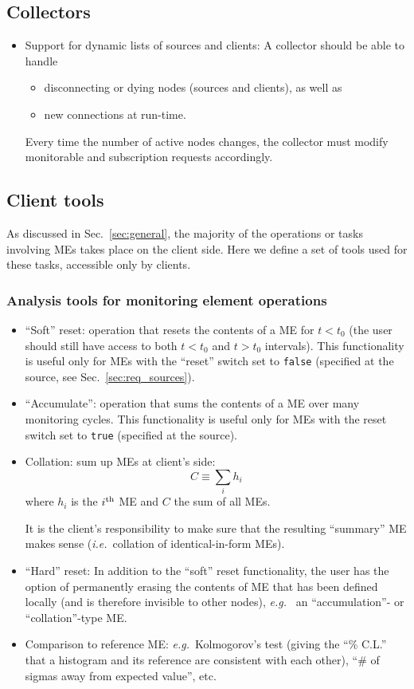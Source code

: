 \documentclass[a4paper]{cmspaper}
\newcommand {\ie}{\mbox{\sl i.e. }}     %
\newcommand {\eg}{\mbox{\sl e.g. }}     %
\begin{document}
\subsection{Collectors}
\label{sec:req_collectors}
\begin{itemize}
\item{Support for dynamic lists of sources and clients: A collector
should be able to handle 
\begin{itemize}
\item{disconnecting or dying nodes (sources and
clients), as well as}
\item{new connections at run-time.}
\end{itemize}
Every time the number of active nodes changes, the collector must
modify monitorable and subscription requests accordingly.}
\end{itemize}
%
%
\subsection{Client tools}
\label{sec:tools}
%
As discussed in Sec.~\ref{sec:general}, the majority of the operations
or tasks involving MEs takes place on the client side. Here we define
a set of tools used for these tasks, accessible only by clients.
%
\subsubsection{Analysis tools for monitoring element operations}
\label{sec:analysis_tools}
%
\begin{itemize}
\item{``Soft'' reset: operation that resets the contents of a ME 
for $t < t_0$ (the user should still have access to both $t < t_0$ and
$t > t_0$ intervals). This functionality is useful only for MEs
with the ``reset'' switch set to {\tt false} (specified at the source, see
Sec.~\ref{sec:req_sources}).}

\item{``Accumulate'': operation that sums the contents of a ME
 over many monitoring cycles. This functionality is useful only
for MEs with the reset switch set to {\tt true} (specified at
the source)}.

\item{Collation: sum up MEs at client's side: 
$$C \equiv \sum_i h_i $$
where $h_i$ is the $i^{\rm th}$ ME and $C$ the sum of all MEs.

It is the client's responsibility to make sure that the resulting ``summary''
ME makes sense (\ie collation of identical-in-form
MEs).}

\item{``Hard'' reset: In addition to the ``soft'' reset functionality, the
user has the option of permanently erasing the contents of ME that has
been defined locally (and is therefore invisible to other nodes), \eg
an ``accumulation''- or ``collation''-type ME.}

\item{Comparison to reference ME: \eg Kolmogorov's test (giving the ``\% C.L.''
that a histogram and its reference are consistent with each other),
``\# of sigmas away from expected value'', etc.}

\end{itemize}
%
%
\end{document}
